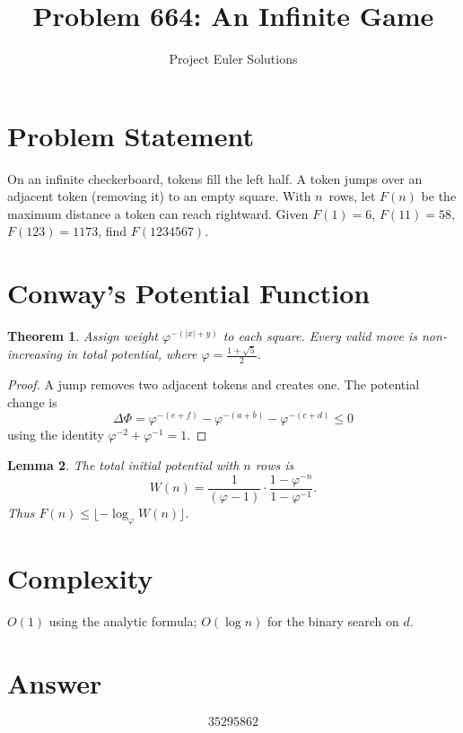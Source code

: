 \documentclass[11pt]{article}
\title{Problem 664: An Infinite Game}
\author{Project Euler Solutions}
\date{}
\newtheorem{theorem}{Theorem}
\newtheorem{lemma}[theorem]{Lemma}
\begin{document}
\maketitle

\section{Problem Statement}

On an infinite checkerboard, tokens fill the left half. A token jumps over an adjacent token (removing it) to an empty square. With $n$~rows, let $F(n)$ be the maximum distance a token can reach rightward. Given $F(1)=6$, $F(11)=58$, $F(123)=1173$, find $F(1234567)$.

\section{Conway's Potential Function}

\begin{theorem}
Assign weight $\varphi^{-(|x|+y)}$ to each square. Every valid move is non-increasing in total potential, where $\varphi = \frac{1+\sqrt{5}}{2}$.
\end{theorem}

\begin{proof}
A jump removes two adjacent tokens and creates one. The potential change is
\[
\Delta\Phi = \varphi^{-(e+f)} - \varphi^{-(a+b)} - \varphi^{-(c+d)} \le 0
\]
using the identity $\varphi^{-2} + \varphi^{-1} = 1$.
\end{proof}

\begin{lemma}
The total initial potential with $n$ rows is
\[
W(n) = \frac{1}{(\varphi-1)} \cdot \frac{1 - \varphi^{-n}}{1 - \varphi^{-1}}.
\]
Thus $F(n) \le \lfloor -\log_\varphi W(n) \rfloor$.
\end{lemma}

\section{Complexity}

$O(1)$ using the analytic formula; $O(\log n)$ for the binary search on $d$.

\section{Answer}

\[
\boxed{35295862}
\]
\end{document}
